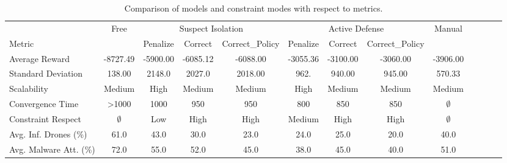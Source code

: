 \begin{table}[t]
    \centering
    \setlength{\tabcolsep}{4.5pt}
    \caption{Comparison of models and constraint modes with respect to metrics.}
    \label{tab:metrics_comparison}
    \begin{tabular}{lcccccccccccc}
                               & {Free}      & \multicolumn{3}{c}{Suspect Isolation} & \multicolumn{3}{c}{Active Defense} & {Manual}                                                              \\
        Metric                 &             & Penalize                              & Correct                            & Correct\_Policy & Penalize & Correct  & Correct\_Policy &             \\
        \midrule
        Average Reward         & -8727.49    & -5900.00                              & -6085.12                           & -6088.00        & -3055.36 & -3100.00 & -3060.00        & -3906.00    \\
        Standard Deviation     & 138.00      & 2148.0                                & 2027.0                             & 2018.00         & 962.     & 940.00   & 945.00          & 570.33      \\
        Scalability            & Medium      & High                                  & Medium                             & Medium          & High     & Medium   & Medium          & Medium      \\
        Convergence Time       & >1000       & 1000                                  & 950                                & 950             & 800      & 850      & 850             & $\emptyset$ \\
        Constraint Respect     & $\emptyset$ & Low                                   & High                               & High            & Medium   & High     & High            & $\emptyset$ \\
        Avg. Inf. Drones (\%)  & 61.0        & 43.0                                  & 30.0                               & 23.0            & 24.0     & 25.0     & 20.0            & 40.0        \\
        Avg. Malware Att. (\%) & 72.0        & 55.0                                  & 52.0                               & 45.0            & 38.0     & 45.0     & 40.0            & 51.0        \\
    \end{tabular}
\end{table}

